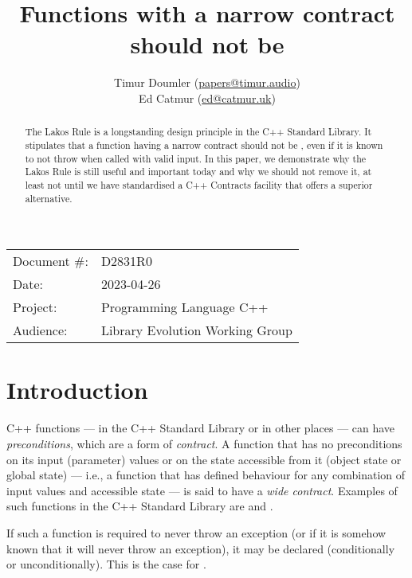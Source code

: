 


\title{Functions with a narrow contract should not be }
\author{ Timur Doumler \small(\href{mailto:papers@timur.audio}{papers@timur.audio})   \\
Ed Catmur \small(\href{mailto:papers@timur.audio}{ed@catmur.uk})  }
\date{}
\maketitle

\begin{tabular}{ll}
Document \#: & D2831R0 \\
Date: &2023-04-26 \\
Project: & Programming Language C++ \\
Audience: & Library Evolution Working Group
\end{tabular}

\begin{abstract}
The Lakos Rule is a longstanding design principle in the C++ Standard Library. It stipulates that a function having a narrow contract should not be , even if it is known to not throw when called with valid input. In this paper, we demonstrate why the Lakos Rule is still useful and important today and why we should not remove it, at least not until we have standardised a C++ Contracts facility that offers a superior alternative.
\end{abstract}

\section{Introduction}
\label{sec:intro}

C++ functions --- in the C++ Standard Library or in other places --- can have \emph{preconditions}, which are a form of \emph{contract}. A function that has no preconditions on its input (parameter) values or on the state accessible from it (object state or global state) --- i.e., a function that has defined behaviour for any combination of input values and accessible state --- is said to have a \emph{wide contract}. Examples of such functions in the C++ Standard Library are  and .

If such a function is required to never throw an exception (or if it is somehow known that it will never throw an exception), it may be declared  (conditionally or unconditionally). This is the case for .

